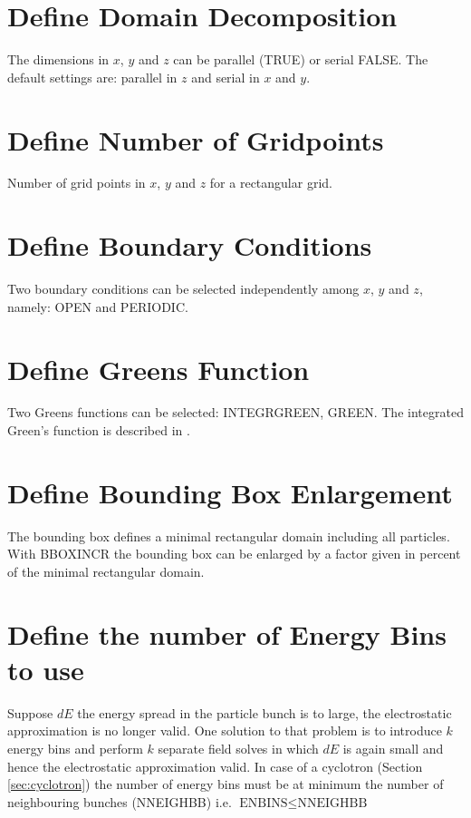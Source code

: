 \section{Define Domain Decomposition}
\label{sec:FSDomDEC}
The dimensions in  $x$, $y$ and $z$ can be parallel (TRUE)  or serial FALSE. The
default settings are: parallel in $z$ and serial in $x$ and $y$. 

\section{Define Number of Gridpoints}
\label{sec:FSMX}
Number of grid points in $x$, $y$ and $z$ for a rectangular grid.

\section{Define Boundary Conditions}
\label{sec:FSBC}
Two boundary conditions can be selected independently among $x$, $y$ and $z$, namely:  OPEN and PERIODIC. 

\section{Define Greens Function}
\label{sec:FSGREEN}
Two Greens functions can be selected: INTEGRGREEN, GREEN. The integrated Green's function is described in \cite{qiang2005}. 

\section{Define Bounding Box Enlargement}
\label{sec:FSBBOX}
The bounding box defines a minimal rectangular domain including all particles. With BBOXINCR 
the bounding box can be enlarged by a factor given in percent of the minimal rectangular domain.

\section{Define the number of Energy Bins to use}
\label{sec:FSENBINS}
Suppose $dE$ the energy spread in the particle bunch is to large, the electrostatic approximation is no longer valid. 
One solution to that problem is to introduce  $k$ energy bins  and perform $k$ separate field solves
in which $dE$ is again small and hence the electrostatic approximation valid. In case of a cyclotron 
(Section \ref{sec:cyclotron}) the number of energy bins must be at minimum the number of neighbouring bunches (NNEIGHBB) i.e.  $\text{ENBINS} \le \text{NNEIGHBB}$ 
